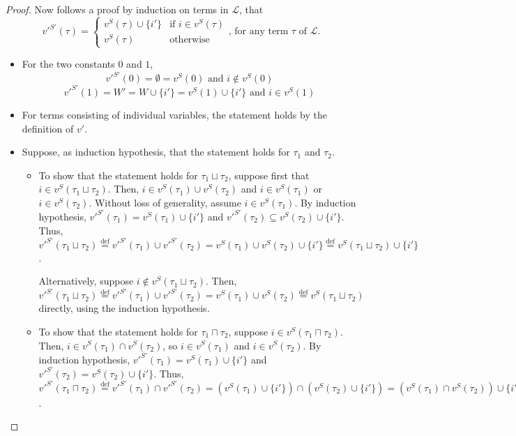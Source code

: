 \documentclass{article}
\newcommand{\lang}{\mathcal{L}}
\newcommand{\lcup}{\sqcup}
\newcommand{\lcap}{\sqcap}
\newcommand{\eqdef}{\stackrel{\text{def}}{=}}
\begin{document}
\begin{proof}
Now follows a proof by induction on terms in $\lang$, that
\begin{equation*}
  v'^{S'}(\tau) =
  \begin{cases}
    v^S(\tau) \cup \{i'\} & \text{if } i \in v^S(\tau) \\
    v^S(\tau)             & \text{otherwise}
  \end{cases}
  \text{, for any term } \tau \text{ of } \lang.
\end{equation*}
\begin{itemize}
  \item For the two constants $0$ and $1$,
    \begin{equation*}
      v'^{S'}(0) = \emptyset = v^S(0) \text{ and } i \not \in v^S(0)
    \end{equation*}
    \begin{equation*}
      v'^{S'}(1) = W' = W \cup \{i'\} = v^S(1) \cup \{i'\} \text{ and } i \in v^S(1)
    \end{equation*}
  \item For terms consisting of individual variables, the statement holds by the definition of $v'$.
  \item Suppose, as induction hypothesis, that the statement holds for $\tau_1$ and $\tau_2$.
    \begin{itemize}
    \item To show that the statement holds for $\tau_1 \lcup \tau_2$, suppose first that $i \in v^S(\tau_1 \lcup \tau_2)$. Then, $i \in v^S(\tau_1) \cup v^S(\tau_2)$ and $i \in v^S(\tau_1)$ or $i \in v^S(\tau_2)$. Without loss of generality, assume $i \in v^S(\tau_1)$. By induction hypothesis, $v'^{S'}(\tau_1) = v^S(\tau_1) \cup \{i'\}$ and $v'^{S'}(\tau_2) \subseteq v^S(\tau_2) \cup \{i'\}$. Thus, $v'^{S'}(\tau_1 \lcup \tau_2) \eqdef v'^{S'}(\tau_1) \cup v'^{S'}(\tau_2) = v^S(\tau_1) \cup v^S(\tau_2) \cup \{i'\} \eqdef v^S(\tau_1 \lcup \tau_2) \cup \{i'\}$.

      Alternatively, suppose $i \not \in v^S(\tau_1 \lcup \tau_2)$. Then, $v'^{S'}(\tau_1 \lcup \tau_2) \eqdef v'^{S'}(\tau_1) \cup v'^{S'}(\tau_2) = v^S(\tau_1) \cup v^S(\tau_2) \eqdef v^S(\tau_1 \lcup \tau_2)$ directly, using the induction hypothesis.

    \item To show that the statement holds for $\tau_1 \lcap \tau_2$, suppose $i \in v^S(\tau_1 \lcap \tau_2)$. Then, $i \in v^S(\tau_1) \cap v^S(\tau_2)$, so $i \in v^S(\tau_1)$ and $i \in v^S(\tau_2)$. By induction hypothesis, $v'^{S'}(\tau_1) = v^S(\tau_1) \cup \{i'\}$ and $v'^{S'}(\tau_2) = v^S(\tau_2) \cup \{i'\}$. Thus, $v'^{S'}(\tau_1 \lcap \tau_2) \eqdef v'^{S'}(\tau_1) \cap v'^{S'}(\tau_2) = (v^S(\tau_1) \cup \{i'\}) \cap (v^S(\tau_2) \cup \{i'\}) = (v^S(\tau_1) \cap v^S(\tau_2)) \cup \{i'\} \eqdef v^S(\tau_1 \lcup \tau_2) \cup \{i'\}$.


\end{itemize}
\end{itemize}
\end{proof}
\end{document}
